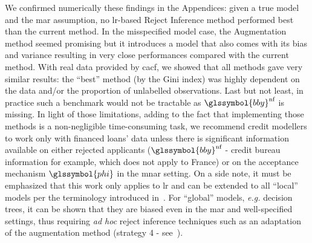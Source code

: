 We confirmed numerically these findings in the Appendices: given a true model and the \gls{mar} assumption, no \gls{lr}-based {Reject Inference} method performed best than the current method. In the misspecified model case, the Augmentation method seemed promising but it introduces a model that also comes with its bias and variance resulting in very close performances compared with the current method. With real data provided by \gls{cacf}, we showed that all methods gave very similar results: the ``best'' method (by the Gini index) was highly dependent on the data and/or the proportion of unlabelled observations. Last but not least, in practice such a benchmark would not be tractable as $\glssymbol{bby}^{\text{nf}}$ is missing. In light of those limitations, adding to the fact that implementing those methods is a non-negligible time-consuming task, we recommend credit modellers to work only with financed loans' data unless there is significant information available on either rejected applicants ($\glssymbol{bby}^{\text{nf}}$ - credit bureau information for example, which does not apply to France) or on the acceptance mechanism $\glssymbol{phi}$ in the \gls{mnar} setting. On a side note, it must be emphasized that this work only applies to \gls{lr} and can be extended to all ``local'' models per the terminology introduced in~\cite{zadrozny}. For ``global'' models, \textit{e.g.} decision trees, it can be shown that they are biased even in the \gls{mar} and well-specified settings, thus requiring \textit{ad hoc} reject inference techniques such as an adaptation of the augmentation method (strategy 4 - see~\cite{}).

\printbibliography[heading=subbibliography, title=References of Chapter 2]